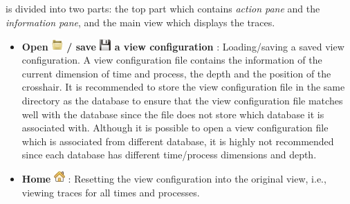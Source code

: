 
\subsection{\traceview}
\label{sec:traceview}

\traceview{} is divided into two parts: the top part which contains \emph{action pane} and the \emph{information pane}, and the main view which displays the traces. 

\begin{itemize}

\item \textbf{Open \includegraphics[scale=.7]{fig/hpctraceviewer-button-open.png} / save \includegraphics[scale=.5]{fig/hpctraceviewer-button-save.png} a view configuration} : Loading/saving a saved view configuration. 
A view configuration file contains the information of the current dimension of time and process, the depth and the position of the crosshair. 
It is recommended to store the view configuration file in the same directory as the database to ensure that the view configuration file matches well with the database since the file does not store which database it is associated with. 
Although it is possible to open a view configuration file which is associated from different database, it is highly not recommended since each database has different time/process dimensions and depth.
\item \textbf{Home} \includegraphics[scale=.5]{fig/hpctraceviewer-button-home-screen.png} : Resetting the view configuration into the original view, i.e., viewing traces for all times and processes.


\end{itemize}
